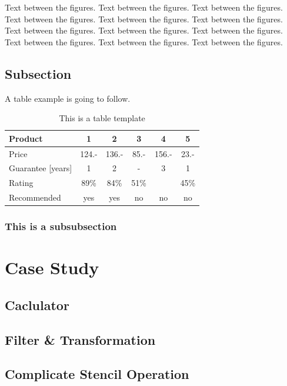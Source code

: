 Text between the figures.  Text between the figures. Text between the figures. Text between the figures.  Text between the figures. Text between the figures. Text between the figures.  Text between the figures. Text between the figures. Text between the figures.  Text between the figures. Text between the figures.

\subsection{Subsection}

A table example is going to follow.

\begin{table}[H]
\centering
\caption{This is a table template}
\begin{tabular}{|l|c|c|c|c|c|}
\hline
Product & 1 & 2 & 3 & 4 & 5\\
\hline
Price & 124.- & 136.- & 85.- & 156.- & 23.-\\
Guarantee [years] & 1 & 2 & - & 3 & 1\\
Rating & 89\% & 84\% & 51\% & & 45\%\\
\hline
\hline
Recommended & yes & yes & no & no & no\\
\hline
\end{tabular}
\label{tab:template2}
\end{table}
\subsubsection{This is a subsubsection}




\section{Case Study}

\subsection{Caclulator}




\subsection{Filter \& Transformation}



\subsection{Complicate Stencil Operation}





